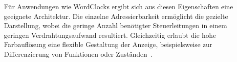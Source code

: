 Für Anwendungen wie WordClocks ergibt sich aus diesen Eigenschaften eine geeignete Architektur. 
Die einzelne Adressierbarkeit ermöglicht die gezielte Darstellung, wobei die geringe Anzahl benötigter Steuerleitungen in einem geringen Verdrahtungsaufwand resultiert. 
Gleichzeitig erlaubt die hohe Farbauflösung eine flexible Gestaltung der Anzeige, beispielsweise zur Differenzierung von Funktionen oder Zuständen~\cite{Worldsemi2013}.